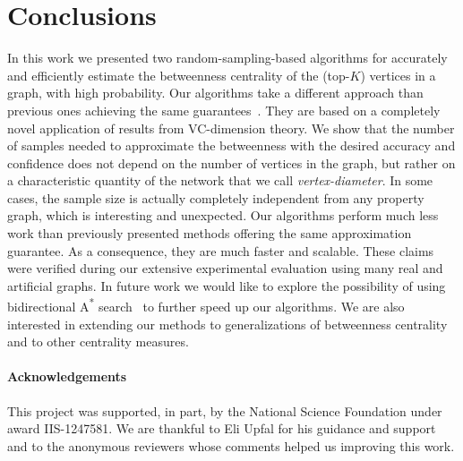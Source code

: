 \section{Conclusions}\label{sec:concl}
In this work we presented two random-sampling-based algorithms for accurately and
efficiently estimate the betweenness centrality of the (top-$K$) vertices in a
graph, with high probability.
Our algorithms take a different approach than previous ones achieving the same
guarantees~\citep{BrandesP07,GeisbergerSS08,JacobKLPT05}. They are based on a
completely novel application of results from VC-dimension theory. We show that
the number of samples needed to approximate the betweenness with the desired
accuracy and confidence does not depend on the number of vertices in the graph,
but rather on a characteristic quantity of the network that we call
\emph{vertex-diameter}. In some cases, the sample size is actually completely
independent from any property graph, which is interesting and unexpected.
Our algorithms perform much less work than previously presented methods offering
the same approximation guarantee. As a consequence, they are much faster and
scalable. These claims were verified during our extensive experimental
evaluation using many real and artificial graphs. In future work we would like
to explore the possibility of using bidirectional A\textsuperscript{*}
search~\citep{Pohl69,KaindlK97} to further speed up our algorithms.  We are also
interested in extending our methods to generalizations of betweenness
centrality~\citep{KourtellisASIT12,DolevEP10} and to other centrality measures. 

\paragraph*{Acknowledgements} This project was supported, in part, by the
National Science Foundation under award IIS-1247581. We are thankful to Eli Upfal for his
guidance and support and to the anonymous reviewers whose comments helped us improving this work.

